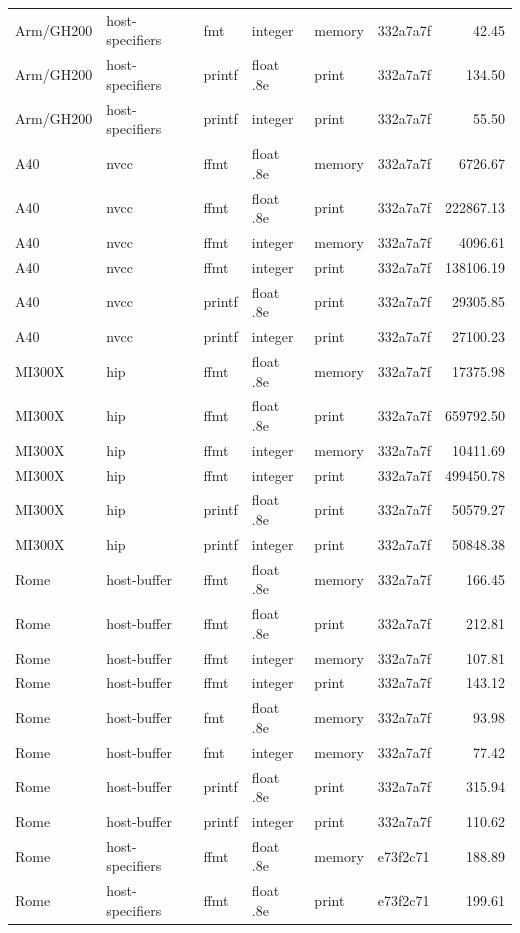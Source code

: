 {{\begin{longtable}{llllllr}
Arm/GH200 & host-specifiers & fmt & integer & memory & 332a7a7f & 42.45 \\
Arm/GH200 & host-specifiers & printf & float .8e & print & 332a7a7f & 134.50 \\
Arm/GH200 & host-specifiers & printf & integer & print & 332a7a7f & 55.50 \\
A40 & nvcc & ffmt & float .8e & memory & 332a7a7f & 6726.67 \\
A40 & nvcc & ffmt & float .8e & print & 332a7a7f & 222867.13 \\
A40 & nvcc & ffmt & integer & memory & 332a7a7f & 4096.61 \\
A40 & nvcc & ffmt & integer & print & 332a7a7f & 138106.19 \\
A40 & nvcc & printf & float .8e & print & 332a7a7f & 29305.85 \\
A40 & nvcc & printf & integer & print & 332a7a7f & 27100.23 \\
MI300X & hip & ffmt & float .8e & memory & 332a7a7f & 17375.98 \\
MI300X & hip & ffmt & float .8e & print & 332a7a7f & 659792.50 \\
MI300X & hip & ffmt & integer & memory & 332a7a7f & 10411.69 \\
MI300X & hip & ffmt & integer & print & 332a7a7f & 499450.78 \\
MI300X & hip & printf & float .8e & print & 332a7a7f & 50579.27 \\
MI300X & hip & printf & integer & print & 332a7a7f & 50848.38 \\
Rome & host-buffer & ffmt & float .8e & memory & 332a7a7f & 166.45 \\
Rome & host-buffer & ffmt & float .8e & print & 332a7a7f & 212.81 \\
Rome & host-buffer & ffmt & integer & memory & 332a7a7f & 107.81 \\
Rome & host-buffer & ffmt & integer & print & 332a7a7f & 143.12 \\
Rome & host-buffer & fmt & float .8e & memory & 332a7a7f & 93.98 \\
Rome & host-buffer & fmt & integer & memory & 332a7a7f & 77.42 \\
Rome & host-buffer & printf & float .8e & print & 332a7a7f & 315.94 \\
Rome & host-buffer & printf & integer & print & 332a7a7f & 110.62 \\
Rome & host-specifiers & ffmt & float .8e & memory & e73f2c71 & 188.89 \\
Rome & host-specifiers & ffmt & float .8e & print & e73f2c71 & 199.61 \\

\end{longtable}}}
